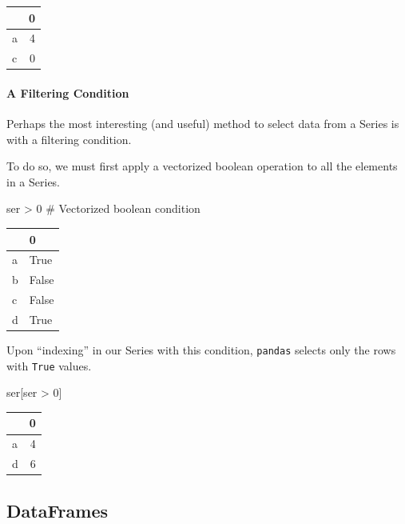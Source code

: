 \documentclass[
  letterpaper,
  DIV=11,
  numbers=noendperiod]{scrreprt}
\let\oldparagraph\paragraph
\renewcommand{\paragraph}[1]{\oldparagraph{#1}\mbox{}}
\newenvironment{Shaded}{\begin{snugshade}}{\end{snugshade}}
\newcommand{\CommentTok}[1]{\textcolor[rgb]{0.37,0.37,0.37}{#1}}
\newcommand{\DecValTok}[1]{\textcolor[rgb]{0.68,0.00,0.00}{#1}}
\newcommand{\NormalTok}[1]{\textcolor[rgb]{0.00,0.23,0.31}{#1}}
\newcommand{\OperatorTok}[1]{\textcolor[rgb]{0.37,0.37,0.37}{#1}}
\begin{document}
\begin{tabular}{lr}
\toprule
{} &  0 \\
\midrule
a &  4 \\
c &  0 \\
\bottomrule
\end{tabular}

\hypertarget{a-filtering-condition}{%
\paragraph{A Filtering Condition}\label{a-filtering-condition}}

Perhaps the most interesting (and useful) method to select data from a
Series is with a filtering condition.

To do so, we must first apply a vectorized boolean operation to all the
elements in a Series.

\begin{Shaded}
\begin{Highlighting}[]
\NormalTok{ser }\OperatorTok{\textgreater{}} \DecValTok{0} \CommentTok{\# Vectorized boolean condition}
\end{Highlighting}
\end{Shaded}

\begin{tabular}{ll}
\toprule
{} &      0 \\
\midrule
a &   True \\
b &  False \\
c &  False \\
d &   True \\
\bottomrule
\end{tabular}

Upon ``indexing'' in our Series with this condition, \texttt{pandas}
selects only the rows with \texttt{True} values.

\begin{Shaded}
\begin{Highlighting}[]
\NormalTok{ser[ser }\OperatorTok{\textgreater{}} \DecValTok{0}\NormalTok{] }
\end{Highlighting}
\end{Shaded}

\begin{tabular}{lr}
\toprule
{} &  0 \\
\midrule
a &  4 \\
d &  6 \\
\bottomrule
\end{tabular}

\hypertarget{dataframes}{%
\subsection{DataFrames}\label{dataframes}}
\end{document}
